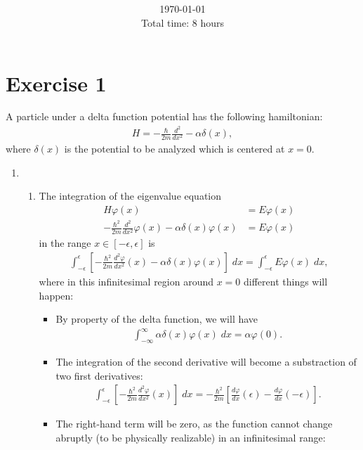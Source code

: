 \documentclass[letterpaper,11pt,twoside]{article}
\title{\textbf{\assignment}\\\course\\{\Large\institution}}
\author{\autor}
\date{\today\\Total time: 8 hours}
\begin{document}
\pagestyle{mainstyle}
\maketitle
\section{Exercise 1}%
A particle under a delta function potential has the following hamiltonian:
\begin{align*}
  H=-\frac{\hbar}{2m}\frac{d^2}{dx^2}-\alpha\delta(x),
\end{align*}
where $\delta(x)$ is the potential to be analyzed which is centered at $x=0$.
\begin{enumerate}[itemsep=0pt,topsep=0pt,label=(\alph*)]
  \item
  \begin{enumerate}[itemsep=0pt,topsep=0pt,label=(a.\arabic*)]
    \item The integration of the eigenvalue equation 
    \begin{align*}
      H\varphi(x)&=E\varphi(x)\\
      -\frac{\hbar^2}{2m}\frac{d^2}{dx^2}\varphi(x)-\alpha\delta(x)\varphi(x)&=E\varphi(x)
    \end{align*}
    in the range $x\in[-\epsilon,\epsilon]$ is 
    \begin{align*}
      \int_{-\epsilon}^\epsilon\left[-\frac{\hbar^2}{2m}\frac{d^2\varphi}{dx^2}(x)-\alpha\delta(x)\varphi(x)\right]\;dx=\int_{-\epsilon}^\epsilon E\varphi(x)\;dx,
    \end{align*}
    where in this infinitesimal region around $x=0$ different things will happen:
    \begin{itemize}
      \item By property of the delta function, we will have
      \begin{align*}
        \int_{-\infty}^\infty \alpha\delta(x)\varphi(x)\;dx=\alpha\varphi(0).
      \end{align*}
      \item The integration of the second derivative will become a substraction of two first derivatives:
      \begin{align*}
        \int_{-\epsilon}^\epsilon\left[-\frac{\hbar^2}{2m}\frac{d^2\varphi}{dx^2}(x)\right]\;dx=-\frac{\hbar^2}{2m}\left[\frac{d\varphi}{dx}(\epsilon)
        -\frac{d\varphi}{dx}(-\epsilon)\right].
      \end{align*}
      \item The right-hand term will be zero, as the function cannot change abruptly (to be physically realizable) in an infinitesimal range:

\end{itemize}
\end{enumerate}
\end{enumerate}
\end{document}
